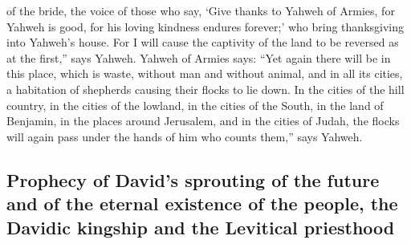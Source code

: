 \begin{paracol}{2}
\begin{otherlanguage}{english}
of the bride, the voice of those who say, `Give thanks to Yahweh of
Armies, for Yahweh is good, for his loving kindness endures forever;'
who bring thanksgiving into Yahweh's house. For I will cause the
captivity of the land to be reversed as at the first,'' says Yahweh.
 Yahweh of Armies says: ``Yet again there will be in this
place, which is waste, without man and without animal, and in all its
cities, a habitation of shepherds causing their flocks to lie down.
 In the cities of the hill country, in the cities of the
lowland, in the cities of the South, in the land of Benjamin, in the
places around Jerusalem, and in the cities of Judah, the flocks will
again pass under the hands of him who counts them,'' says Yahweh.

\hypertarget{prophecy-of-davids-sprouting-of-the-future-and-of-the-eternal-existence-of-the-people-the-davidic-kingship-and-the-levitical-priesthood}{%
\subsection{Prophecy of David's sprouting of the future and of the
eternal existence of the people, the Davidic kingship and the Levitical
priesthood}\label{prophecy-of-davids-sprouting-of-the-future-and-of-the-eternal-existence-of-the-people-the-davidic-kingship-and-the-levitical-priesthood}}


\end{otherlanguage}
\end{paracol}
